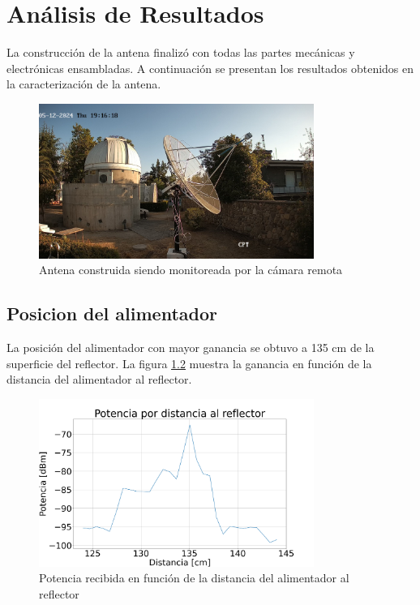 \chapter{Análisis de Resultados}

La construcción de la antena finalizó con todas las partes mecánicas y electrónicas ensambladas. A continuación se presentan los resultados obtenidos en la caracterización de la antena.\\

\begin{figure}
    \centering
    \includegraphics[width=0.8\textwidth]{img/antenna}
    \caption{Antena construida siendo monitoreada por la cámara remota}
    \label{fig:antena}
\end{figure}

\section{Posicion del alimentador} \label{sec:posicion}

La posición del alimentador con mayor ganancia se obtuvo a 135 cm de la superficie del reflector. La figura \ref{fig:distancia} muestra la ganancia en función de la distancia del alimentador al reflector.\\

\begin{figure}
    \centering
    \includegraphics[width=0.8\textwidth]{img/enfoqueDist}
    \caption{Potencia recibida en función de la distancia del alimentador al reflector}
    \label{fig:distancia}
\end{figure}

